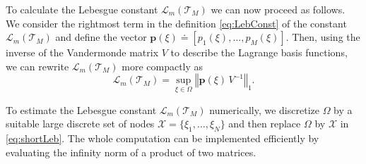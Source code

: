 \documentclass{svjour3}
\newcommand{\de}{\mathrm{d}}
\renewcommand{\de}{\mathrm{d}} %
\begin{document}
To calculate the Lebesgue constant $\mathscr{L}_m \left(\mathcal{T}_M\right)$ we can now proceed as follows. We consider the rightmost term in the definition \eqref{eq:LebConst} of the constant $ \mathscr{L}_m \left(\mathcal{T}_M\right) $ %
and define the vector
$ \boldsymbol{p} (\xi) \doteq \left[ p_1 \left(\xi\right), \ldots, p_M (\xi) \right] $.
Then, using the inverse of the Vandermonde matrix $V$ to describe the Lagrange basis functions, we can rewrite $\mathscr{L}_m \left(\mathcal{T}_M\right)$ more compactly as
	\begin{equation} \label{eq:shortLeb}
		\mathscr{L}_m \left(\mathcal{T}_M\right) = \sup_{\xi \in \Omega} \left\Vert \boldsymbol{p} (\xi) \, V^{-1}  \right\Vert_1 .
	\end{equation}
	
To estimate the Lebesgue constant $\mathscr{L}_m \left(\mathcal{T}_M\right)$ numerically, we discretize $ \Omega $ by a suitable large discrete set of nodes $ \mathcal{X} = \{ \xi_1, \ldots, \xi_N\} $ and then replace $ \Omega $ by $ \mathcal{X} $ in \eqref{eq:shortLeb}. The whole computation can be implemented efficiently by evaluating the infinity norm of a product of two matrices. 
\end{document}
